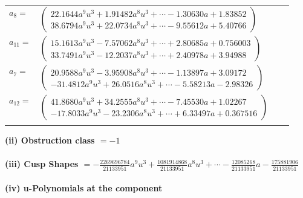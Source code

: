 \documentclass[1p]{elsarticle_modified}
\theoremstyle{definition}
\begin{document}
\begin{tabular}{m{7pt} m{180pt} m{7pt} m{180pt} }
\flushright $a_{8}=$&$\begin{pmatrix}22.1644 a^{9} u^{3}+1.91482 a^{8} u^{3}+\cdots-1.30630 a+1.83852\\38.6794 a^{9} u^{3}+22.0734 a^{8} u^{3}+\cdots-9.55612 a+5.40766\end{pmatrix}$ \\
\flushright $a_{11}=$&$\begin{pmatrix}15.1613 a^{9} u^{3}-7.57062 a^{8} u^{3}+\cdots+2.80685 a+0.756003\\33.7491 a^{9} u^{3}-12.2037 a^{8} u^{3}+\cdots+2.40978 a+3.94988\end{pmatrix}$ \\
\flushright $a_{7}=$&$\begin{pmatrix}20.9588 a^{9} u^{3}-3.95908 a^{8} u^{3}+\cdots-1.13897 a+3.09172\\-31.4812 a^{9} u^{3}+26.0516 a^{8} u^{3}+\cdots-5.58213 a-2.98326\end{pmatrix}$ \\
\flushright $a_{12}=$&$\begin{pmatrix}41.8680 a^{9} u^{3}+34.2555 a^{8} u^{3}+\cdots-7.45530 a+1.02267\\-17.8033 a^{9} u^{3}-23.2306 a^{8} u^{3}+\cdots+6.33497 a+0.367516\end{pmatrix}$\\&\end{tabular}
\flushleft \textbf{(ii) Obstruction class $= -1$}\\~\\
\flushleft \textbf{(iii) Cusp Shapes $= -\frac{2269696784}{21133951} a^9 u^3+\frac{1081914868}{21133951} a^8 u^3+\cdots-\frac{12085268}{21133951} a-\frac{175881906}{21133951}$}\\~\\
\newpage\renewcommand{\arraystretch}{1}
\flushleft \textbf{(iv) u-Polynomials at the component}\newline \\
\end{document}
